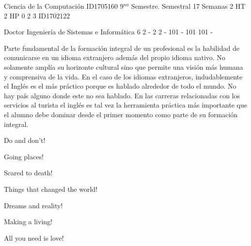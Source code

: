 \documentclass[a4paper,8pt]{article}
\begin{document}
\setNombreProfesor{}
\setGradoProfesorAbreviado{}
\sylabusHeader

\academicaTable
{Ciencia de la Computación} %
{ID1705160} %
{9$^{no}$ Semestre.} %
{Semestral} %
{17 Semanas} %
{2 HT} %
{2 HP} %
{0} %
{}  %
{2} %
{3} %
{ID1702122} %

\administrativaTable
{Doctor} %
{Ingeniería de Sistemas e Informática} %
{6} %
{2} %
{-} %
{2} %
{2} %
{-} %
{101} %
{-} %
{101} %
{101} %
{-} %


\begin{fundamentacion}
Parte fundamental de la formación integral de un profesional es la habilidad de comunicarse en un idioma extranjero además del propio idioma nativo. No solamente amplía su horizonte cultural sino que permite una visión más humana y comprensiva de la vida. En el caso de los idiomas extranjeros, indudablemente el Inglés es el 
más práctico porque es hablado alrededor de todo el mundo. No hay país alguno donde este no sea hablado. En las carreras relacionadas con los servicios al turista el inglés es tal vez la herramienta práctica más importante que el alumno debe dominar desde el primer momento como parte de su formación integral.

\end{fundamentacion}

\begin{sumilla}
\item Do and don't!
\item Going places!
\item Scared to death!
\item Things that changed the world!
\item Dreams and reality!
\item Making a living!
\item All you need is love!

\end{sumilla}
\end{document}
